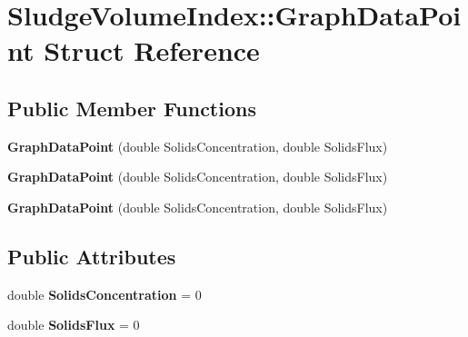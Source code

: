 \hypertarget{struct_sludge_volume_index_1_1_graph_data_point}{}\section{Sludge\+Volume\+Index\+:\+:Graph\+Data\+Point Struct Reference}
\label{struct_sludge_volume_index_1_1_graph_data_point}
\subsection*{Public Member Functions}
\begin{DoxyCompactItemize}
\item 
\mbox{\label{struct_sludge_volume_index_1_1_graph_data_point_a2926998c98ac1cbbb07ef50d581904ed}} 
{\bfseries Graph\+Data\+Point} (double Solids\+Concentration, double Solids\+Flux)
\item 
\mbox{\label{struct_sludge_volume_index_1_1_graph_data_point_a2926998c98ac1cbbb07ef50d581904ed}} 
{\bfseries Graph\+Data\+Point} (double Solids\+Concentration, double Solids\+Flux)
\item 
\mbox{\label{struct_sludge_volume_index_1_1_graph_data_point_a2926998c98ac1cbbb07ef50d581904ed}} 
{\bfseries Graph\+Data\+Point} (double Solids\+Concentration, double Solids\+Flux)
\end{DoxyCompactItemize}
\subsection*{Public Attributes}
\begin{DoxyCompactItemize}
\item 
\mbox{\label{struct_sludge_volume_index_1_1_graph_data_point_ab78d43aa87e66f31947a230d4daf6b82}} 
double {\bfseries Solids\+Concentration} = 0
\item 
\mbox{\label{struct_sludge_volume_index_1_1_graph_data_point_a69b33e4fa40aa5bdea764ff483796a11}} 
double {\bfseries Solids\+Flux} = 0
\end{DoxyCompactItemize}


